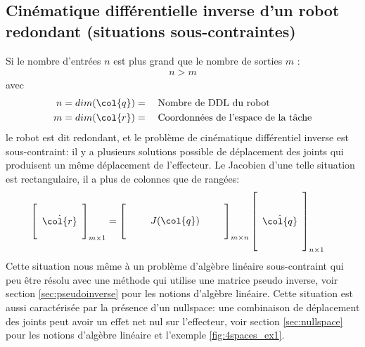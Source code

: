\subsection{Cinématique différentielle inverse d'un robot redondant (situations sous-contraintes)}
\label{sec:invdiffkinredondant}

Si le nombre d'entrées $n$ est plus grand que le nombre de sorties $m$ : 
\begin{align}
n > m
\end{align} 
avec 
\begin{align}
n &= dim(\col{q}) = \quad\text{Nombre de DDL du robot} \\
m &= dim(\col{r}) = \quad\text{Coordonnées de l'espace de la tâche} 
\end{align} 
le robot est dit redondant, et le problème de cinématique différentiel inverse est sous-contraint: il y a plusieurs solutions possible de déplacement des joints qui produisent un même déplacement de l'effecteur. Le Jacobien d'une telle situation est rectangulaire, il a plus de colonnes que de rangées:
\begin{align}
\left[ \begin{array}{c}  \\ \dot{\col{r}} \\ \\
\end{array} \right]_{m \times 1}
&= 
\left[ \begin{array}{c c c c c} 
&&&&\\
&& J(\col{q}) &&\\
&&&&
\end{array} \right]_{m \times n}
\left[ \begin{array}{c} 
\\ \\ \dot{\col{q}} \\ \\ \\
\end{array} \right]_{n \times 1}
\label{eq:underconstraintdiffkin}
\end{align} 
Cette situation nous même à un problème d'algèbre linéaire sous-contraint qui peu être résolu avec une méthode qui utilise une matrice pseudo inverse, voir section \ref{sec:pseudoinverse} pour les notions d'algèbre linéaire. Cette situation est aussi caractérisée par la présence d'un nullspace: une combinaison de déplacement des joints peut avoir un effet net nul sur l'effecteur, voir section \ref{sec:nullspace} pour les notions d'algèbre linéaire et l'exemple \ref{fig:4spaces_ex1}. 

